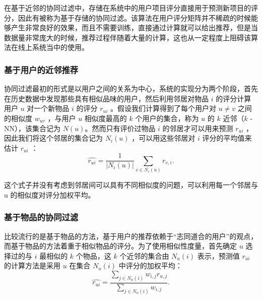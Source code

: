 在基于近邻的协同过滤中，存储在系统中的用户项目评分直接用于预测新项目的评分，因此有被称为基于存储的协同过滤。该算法在用户评分矩阵并不稀疏的时候能够产生非常良好的效果，而且不需要训练，直接通过计算就可以给出推荐，但是当数据量非常庞大的时候，推荐过程伴随着大量的计算，这也从一定程度上阻碍该算法在线上系统当中的使用。

\subsubsection{基于用户的近邻推荐}
协同过滤最初的形式是以用户之间的关系为中心\cite{Desrosiers2011A}，系统的实现分为两个阶段，首先在历史数据中发现那些具有相似品味的用户，然后利用邻居对物品 $i$ 的评分计算用户 $u$ 对一个新物品 $i$ 的评分 $r_{ui}$ 。假设我们计算得到了每个用户对 $u \neq v$ 之间的相似度 $w_{uv}$ ，与用户 $u$ 相似度最高的 $k$ 个用户的集合，称为 $u$ 的 $k$ 近邻（$k$ -NN），该集合记为 $N(u)$。然而只有评价过物品 $i$ 的邻居才可以用来预测 $r_{ui}$ ，因此我们将这个邻居的集合记为  $N_i (u)$ ，可以用这些邻居对 $i$ 评分的平均值来估计  $r_{ui}$ ：
\begin{equation}
\hat{r_{ui}} = \dfrac {1}  {| N_i (u) | }   \sum_{v \in  N_i (u)}{ r_{v,i} } .
\end{equation}

这个式子并没有考虑到邻居间可以具有不同相似度的问题，可以利用每一个邻居与 u 的相似度对评分加权平均。

\subsubsection{基于物品的协同过滤}
比较流行的是基于物品的方法\cite{Sarwar2001Item,linden2003amazon}，基于用户的推荐依赖于“志同道合的用户”的观点，而基于物品的方法着重于相似物品的评分。为了使用相似性度量，首先确定 $u$ 选择过的与 $i$ 最相似的 $k$ 个物品，这 $k$ 个近邻的集合由 $N_u (i)$  表示，预测值 $r_{ui}$ 的计算方法是采用 $u$ 在集合 $N_u (i)$  中评分的加权平均：
\begin{equation}
\hat{r_{ui}} = \dfrac { \sum\limits_{j \in N_u (i)} w_{i,j} r_{u,j}}  {\sum\limits_{j \in N_u (i)} w_{i,j} } .
\end{equation}


